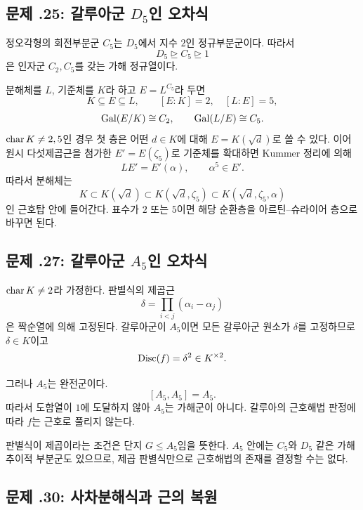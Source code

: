 \subsection*{문제 \thechapter.25: 갈루아군 $D_5$인 오차식}

\begin{solution}
정오각형의 회전부분군 $C_5$는 $D_5$에서 지수 $2$인 정규부분군이다.
따라서
\[
  D_5\trianglerighteq C_5\trianglerighteq1
\]
은 인자군 $C_2,C_5$를 갖는 가해 정규열이다.

분해체를 $L$, 기준체를 $K$라 하고 $E=L^{C_5}$라 두면
\[
  K\subseteq E\subseteq L,
  \qquad [E:K]=2,\quad [L:E]=5,
\]
\[
  \operatorname{Gal}(E/K)\cong C_2,
  \qquad \operatorname{Gal}(L/E)\cong C_5.
\]
$\operatorname{char} K\ne2,5$인 경우 첫 층은 어떤 $d\in K$에 대해
$E=K(\sqrt d)$로 쓸 수 있다. 이어 원시 다섯제곱근을 첨가한
$E'=E(\zeta_5)$로 기준체를 확대하면 Kummer 정리에 의해
\[
  LE'=E'(\alpha),
  \qquad \alpha^5\in E'.
\]
따라서 분해체는
\[
  K\subset K(\sqrt d)
  \subset K(\sqrt d,\zeta_5)
  \subset K(\sqrt d,\zeta_5,\alpha)
\]
인 근호탑 안에 들어간다. 표수가 $2$ 또는 $5$이면 해당 순환층을
아르틴--슈라이어 층으로 바꾸면 된다.
\end{solution}

\subsection*{문제 \thechapter.27: 갈루아군 $A_5$인 오차식}

\begin{solution}
$\operatorname{char} K\ne2$라 가정한다. 판별식의 제곱근
\[
  \delta=\prod_{i<j}(\alpha_i-\alpha_j)
\]
은 짝순열에 의해 고정된다. 갈루아군이 $A_5$이면 모든 갈루아군
원소가 $\delta$를 고정하므로 $\delta\in K$이고
\[
  \operatorname{Disc}(f)=\delta^2\in K^{\times2}.
\]

그러나 $A_5$는 완전군이다.
\[
  [A_5,A_5]=A_5.
\]
따라서 도함열이 $1$에 도달하지 않아 $A_5$는 가해군이 아니다.
갈루아의 근호해법 판정에 따라 $f$는 근호로 풀리지 않는다.

판별식이 제곱이라는 조건은 단지 $G\le A_5$임을 뜻한다. $A_5$ 안에는
$C_5$와 $D_5$ 같은 가해 추이적 부분군도 있으므로, 제곱 판별식만으로
근호해법의 존재를 결정할 수는 없다.
\end{solution}

\subsection*{문제 \thechapter.30: 사차분해식과 근의 복원}

